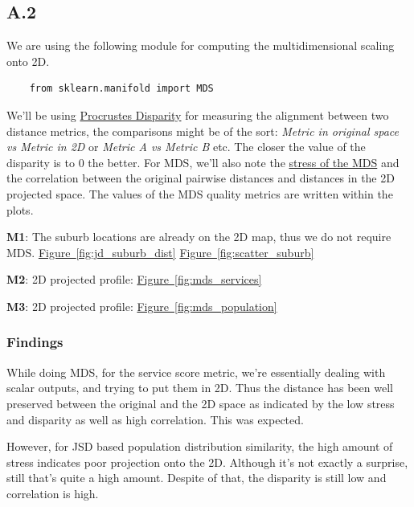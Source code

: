 \documentclass[
	a4paper, %
	10pt, %
	unnumberedsections, %
	twoside, %
]{LTJournalArticle}
\begin{document}
\subsection{A.2}

We are using the following module for computing the multidimensional scaling onto 2D.
\begin{verbatim}
    from sklearn.manifold import MDS
\end{verbatim}

We'll be using \href{https://en.wikipedia.org/wiki/Procrustes_analysis}{Procrustes Disparity} for measuring the alignment between two distance metrics, the comparisons might be of the sort: \textit{Metric in original space vs Metric in 2D} or \textit{Metric A vs Metric B} etc. The closer the value of the disparity is to 0 the better. For MDS, we'll also note the \href{https://imaging.mrc-cbu.cam.ac.uk/statswiki/FAQ/mds/stress#:~:text=The%20measure%20of%20goodness%20of,or%20more%20estimated%20stimuli%20dimensions}{stress of the MDS} and the correlation between the original pairwise distances and distances in the 2D projected space. The values of the MDS quality metrics are written within the plots.

\textbf{M1}: The suburb locations are already on the 2D map, thus we do not require MDS.  \hyperref[sub@fig:jd_suburb_dist]{Figure~\ref{fig:jd_suburb_dist}} \hyperref[sub@fig:scatter_suburb]{Figure~\ref{fig:scatter_suburb}}

\textbf{M2}: 2D projected profile: \hyperref[sub@fig:mds_services]{Figure~\ref{fig:mds_services}}

\textbf{M3}: 2D projected profile: \hyperref[sub@fig:mds_population]{Figure~\ref{fig:mds_population}}




\subsubsection{Findings}

While doing MDS, for the service score metric, we're essentially dealing with scalar outputs, and trying to put them in 2D. Thus the distance has been well preserved between the original and the 2D space as indicated by the low stress and disparity as well as high correlation. This was expected.

However, for JSD based population distribution similarity, the high amount of stress indicates poor projection onto the 2D. Although it's not exactly a surprise, still that's quite a high amount. Despite of that, the disparity is still low and correlation is high. 
\end{document}
